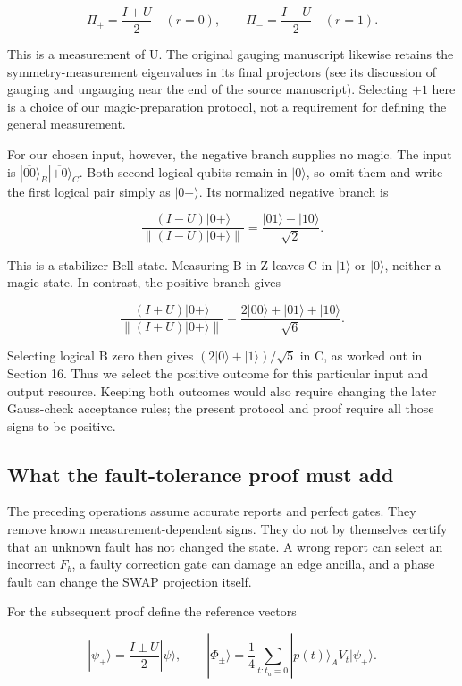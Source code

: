 \documentclass[11pt]{article}
\begin{document}
\[
\Pi_+=\frac{I+U}{2}\quad(r=0),\qquad
\Pi_-=\frac{I-U}{2}\quad(r=1).
\]

This is a measurement of U. The original gauging manuscript likewise retains the symmetry-measurement eigenvalues in its final projectors (see its discussion of gauging and ungauging near the end of the source manuscript). Selecting \(+1\) here is a choice of our magic-preparation protocol, not a requirement for defining the general measurement.

For our chosen input, however, the negative branch supplies no magic. The input is \(|\overline{00}\rangle_B|\overline{+0}\rangle_C\). Both second logical qubits remain in \(|0\rangle\), so omit them and write the first logical pair simply as \(|0+\rangle\). Its normalized negative branch is

\[
\frac{(I-U)|0+\rangle}{\|(I-U)|0+\rangle\|}
=\frac{|01\rangle-|10\rangle}{\sqrt2}.
\]

This is a stabilizer Bell state. Measuring B in Z leaves C in \(|1\rangle\) or \(|0\rangle\), neither a magic state. In contrast, the positive branch gives

\[
\frac{(I+U)|0+\rangle}{\|(I+U)|0+\rangle\|}
=\frac{2|00\rangle+|01\rangle+|10\rangle}{\sqrt6}.
\]

Selecting logical B zero then gives \((2|0\rangle+|1\rangle)/\sqrt5\) in C, as worked out in Section 16. Thus we select the positive outcome for this particular input and output resource. Keeping both outcomes would also require changing the later Gauss-check acceptance rules; the present protocol and proof require all those signs to be positive.

\subsection{What the fault-tolerance proof must add}
The preceding operations assume accurate reports and perfect gates. They remove known measurement-dependent signs. They do not by themselves certify that an unknown fault has not changed the state. A wrong report can select an incorrect \(F_b\), a faulty correction gate can damage an edge ancilla, and a phase fault can change the SWAP projection itself.

For the subsequent proof define the reference vectors

\[
|\psi_\pm\rangle=\frac{I\pm U}{2}|\psi\rangle,\qquad
|\Phi_\pm\rangle=\frac14\sum_{t:t_a=0}|p(t)\rangle_A V_t|\psi_\pm\rangle.
\]
\end{document}

